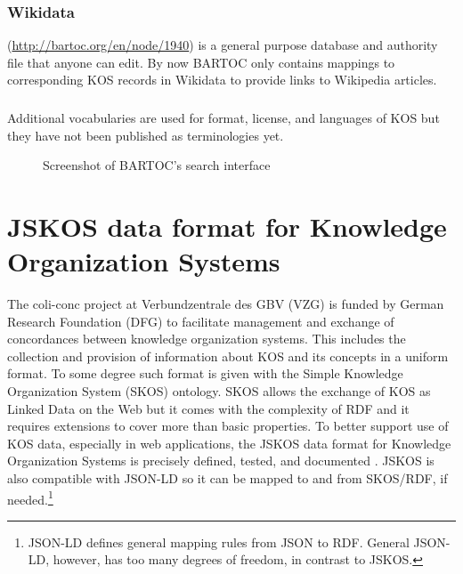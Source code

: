 \documentclass[12pt,a4paper]{llncs}
\begin{document}
\subsubsection{Wikidata}
(\href{http://bartoc.org/en/node/1940}{http://bartoc.org/en/node/1940})
is a general purpose database and authority file that anyone can edit. By now BARTOC only contains mappings to corresponding KOS records in Wikidata to provide links to Wikipedia articles.

\subsubsection{}\hspace{-0.4em}%
Additional vocabularies are used for format, license, and languages of KOS but they have not been published as terminologies yet.

\begin{figure}\centering
{}
\caption{Screenshot of BARTOC's search interface}
\end{figure}

\vfill

\section{JSKOS data format for Knowledge Organization Systems}
\label{sec:jskos}
The coli-conc project at Verbundzentrale des GBV (VZG) is funded by German Research Foundation (DFG) to facilitate management and exchange of concordances between knowledge organization systems. This includes the collection and provision of information about KOS and its concepts in a uniform format. To some degree such format is given with the Simple Knowledge Organization System (SKOS) ontology.  SKOS allows the exchange of KOS as Linked Data on the Web but it comes with the complexity of RDF and it requires extensions to cover more than basic properties.
To better support use of KOS data, especially in web applications, the JSKOS data format for Knowledge Organization Systems is precisely defined, tested, and documented \cite{JSKOS}. JSKOS is also compatible with JSON-LD so it can be mapped to and from SKOS/RDF, if needed.\footnote{JSON-LD defines general mapping rules from JSON to RDF. General JSON-LD, however, has too many degrees of freedom, in contrast to JSKOS.}
\end{document}
